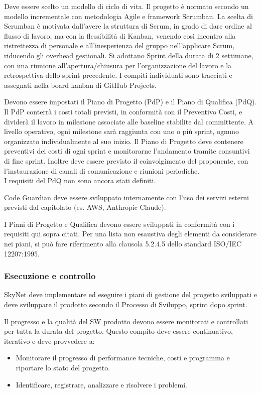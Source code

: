 \documentclass[12pt, a4paper]{article}
\begin{document}
Deve essere scelto un modello di ciclo di vita. Il progetto è normato secondo un modello incrementale con metodologia Agile e framework Scrumban. La scelta di Scrumban è motivata dall'avere la struttura di Scrum, in grado di dare ordine al flusso di lavoro, ma con la flessibilità di Kanban, venendo così incontro alla ristrettezza di personale e all'inesperienza del gruppo nell'applicare Scrum, riducendo gli overhead gestionali. Si adottano Sprint della durata di 2 settimane, con una riunione all'apertura/chiusura per l'organizzazione del lavoro e la retrospettiva dello sprint precedente. I compiti individuati sono tracciati e assegnati nella board kanban di GitHub Projects.

Devono essere impostati il Piano di Progetto (PdP) e il Piano di Qualifica (PdQ). Il PdP conterrà i costi totali previsti, in conformità con il Preventivo Costi, e dividerà il lavoro in milestone associate alle baseline stabilite dal committente. A livello operativo, ogni milestone sarà raggiunta con uno o più sprint, ognuno organizzato individualmente al suo inizio. Il Piano di Progetto deve contenere preventivi dei costi di ogni sprint e monitorarne l'andamento tramite consuntivi di fine sprint. Inoltre deve essere previsto il coinvolgimento del proponente, con l'instaurazione di canali di comunicazione e riunioni periodiche.\\
I requisiti del PdQ non sono ancora stati definiti.

Code Guardian deve essere sviluppato internamente con l'uso dei servizi esterni previsti dal capitolato (es. AWS, Anthropic Claude).

I Piani di Progetto e Qualifica devono essere sviluppati in conformità con i requisiti qui sopra citati. Per una lista non esaustiva degli elementi da considerare nei piani, si può fare riferimento alla clausola 5.2.4.5 dello standard ISO/IEC 12207:1995.

\subsubsection{Esecuzione e controllo}
SkyNet deve implementare ed eseguire i piani di gestione del progetto sviluppati e deve sviluppare il prodotto secondo il Processo di Sviluppo, sprint dopo sprint.

Il progresso e la qualità del SW prodotto devono essere monitorati e controllati per tutta la durata del progetto. Questo compito deve essere continuativo, iterativo e deve provvedere a:
\begin{itemize}
    \item Monitorare il progresso di performance tecniche, costi e programma e riportare lo stato del progetto.
    \item Identificare, registrare, analizzare e risolvere i problemi.
\end{itemize}
\end{document}
